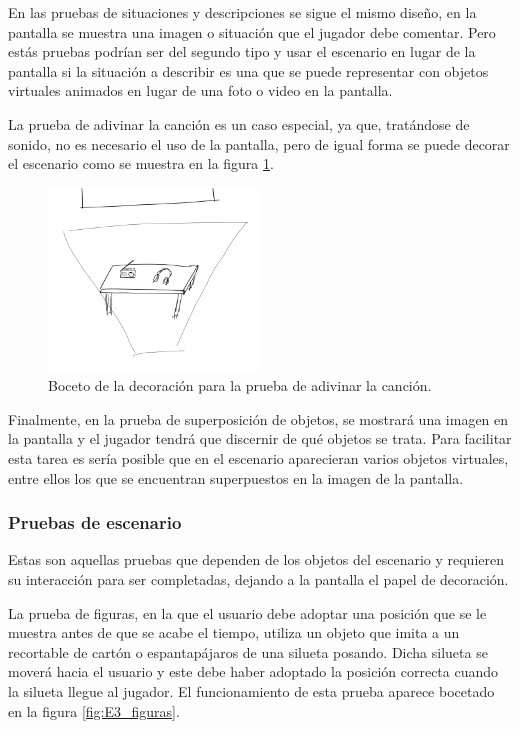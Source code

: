 En las pruebas de situaciones y descripciones se sigue el mismo diseño, en la pantalla se muestra una imagen o situación que el jugador debe comentar. Pero estás pruebas podrían ser del segundo tipo y usar el escenario en lugar de la pantalla si la situación a describir es una que se puede representar con objetos virtuales animados en lugar de una foto o video en la pantalla.

La prueba de adivinar la canción es un caso especial, ya que, tratándose de sonido, no es necesario el uso de la pantalla, pero de igual forma se puede decorar el escenario como se muestra en la figura \ref{fig:E3_cancion}.

\begin{figure}
  \centering
    \includegraphics[width=0.5\textwidth]{04.Desarrollo/03.Entrega3/01.Iteracion3_1/00.Figuras/07.cancion.png}
    \caption{Boceto de la decoración para la prueba de adivinar la canción.}
    \label{fig:E3_cancion}
\end{figure}

Finalmente, en la prueba de superposición de objetos, se mostrará una imagen en la pantalla y el jugador tendrá que discernir de qué objetos se trata. Para facilitar esta tarea es sería posible que en el escenario aparecieran varios objetos virtuales, entre ellos los que se encuentran superpuestos en la imagen de la pantalla.



\subsubsection{Pruebas de escenario}

Estas son aquellas pruebas que dependen de los objetos del escenario y requieren su interacción para ser completadas, dejando a la pantalla el papel de decoración.

La prueba de figuras, en la que el usuario debe adoptar una posición que se le muestra antes de que se acabe el tiempo, utiliza un objeto que imita a un recortable de cartón o espantapájaros de una silueta posando. Dicha silueta se moverá hacia el usuario y este debe haber adoptado la posición correcta cuando la silueta llegue al jugador. El funcionamiento de esta prueba aparece bocetado en la figura \ref{fig:E3_figuras}.


